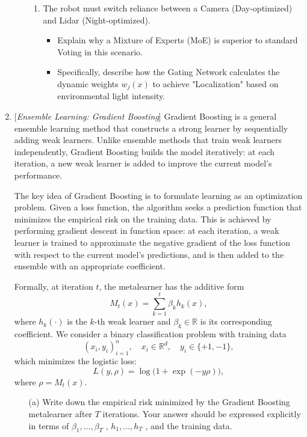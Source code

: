 \documentclass[10pt]{article}
\begin{document}
\begin{enumerate}
\begin{enumerate}
\begin{enumerate}
    \item 
    The robot must switch reliance between a Camera (Day-optimized) and Lidar (Night-optimized).
    \begin{itemize}
        \item Explain why a Mixture of Experts (MoE) is superior to standard Voting in this scenario.
        \item Specifically, describe how the Gating Network calculates the dynamic weights $w_j(x)$ to achieve "Localization" based on environmental light intensity.
    \end{itemize}
\end{enumerate}
\end{enumerate}

\newpage



\item {} {[}\textit{Ensemble Learning: Gradient Boosting}{]} Gradient Boosting is a general ensemble learning method that constructs a strong learner by sequentially adding weak learners. Unlike ensemble methods that train weak learners independently, Gradient Boosting builds the model iteratively: at each iteration, a new weak learner is added to improve the current model's performance.

The key idea of Gradient Boosting is to formulate learning as an optimization problem. Given a loss function, the algorithm seeks a prediction function that minimizes the empirical risk on the training data. This is achieved by performing gradient descent in function space: at each iteration, a weak learner is trained to approximate the negative gradient of the loss function with respect to the current model's predictions, and is then added to the ensemble with an appropriate coefficient.

Formally, at iteration $t$, the metalearner has the additive form 
$$M_t(x) = \sum_{k=1}^{t} \beta_k h_k(x),  $$
where $h_k(\cdot)$  is the $k$-th weak learner and $\beta_k \in \mathbb{R}$ is its corresponding coefficient.
We consider a binary classification problem with training data  
$${(x_i, y_i)}_{i=1}^n,\quad x_i \in \mathbb{R}^d, \quad y_i \in \{+1, -1\},  $$
 which minimizes the logistic loss:
$$L(y, \rho) = \log\big(1 + \exp(-y\rho)\big), $$
where $\rho = M_t(x)$.
\begin{itemize}
	\item[(a)] Write down the empirical risk minimized by the Gradient Boosting metalearner after $T$ iterations. Your answer should be expressed explicitly in terms of $\beta_1, \dots, \beta_T$ , $h_1, \dots, h_T$ , and the training data.   
    

\end{itemize}
\end{enumerate}
\end{document}

